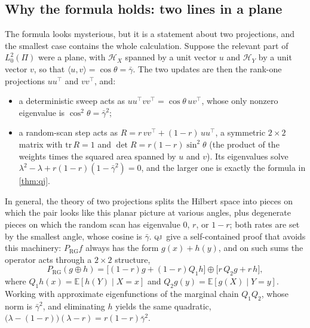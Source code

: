 \documentclass[11pt]{article}
\theoremstyle{remark}
\newcommand{\QJ}{\textsc{qj}}
\newcommand{\E}{\mathbb{E}}
\newcommand{\RG}{\mathrm{RG}}
\begin{document}
\subsection{Why the formula holds: two lines in a plane}
The formula looks mysterious, but it is a statement about two projections, and the smallest case contains the whole calculation. Suppose the relevant part of $L_0^2(\Pi)$ were a plane, with $\mathcal H_X$ spanned by a unit vector $u$ and $\mathcal H_Y$ by a unit vector $v$, so that $\langle u,v\rangle=\cos\theta=\bar\gamma$. The two updates are then the rank-one projections $uu^\top$ and $vv^\top$, and:
\begin{itemize}[leftmargin=1.3em,nosep]
\item a deterministic sweep acts as $uu^\top vv^\top=\cos\theta\,uv^\top$, whose only nonzero eigenvalue is $\cos^2\theta=\bar\gamma^2$;
\item a random-scan step acts as $R=r\,vv^\top+(1-r)\,uu^\top$, a symmetric $2\times2$ matrix with $\mathrm{tr}\,R=1$ and $\det R=r(1-r)\sin^2\theta$ (the product of the weights times the squared area spanned by $u$ and $v$). Its eigenvalues solve $\lambda^2-\lambda+r(1-r)(1-\bar\gamma^2)=0$, and the larger one is exactly the formula in \cref{thm:qj}.
\end{itemize}
In general, the theory of two projections \citep{bottcher2010gentle} splits the Hilbert space into pieces on which the pair looks like this planar picture at various angles, plus degenerate pieces on which the random scan has eigenvalue $0$, $r$, or $1-r$; both rates are set by the smallest angle, whose cosine is $\bar\gamma$. \QJ\ give a self-contained proof that avoids this machinery: $P_\RG f$ always has the form $g(x)+h(y)$, and on such sums the operator acts through a $2\times2$ structure,
\[
P_\RG(g\oplus h)=\bigl[(1-r)g+(1-r)Q_1h\bigr]\oplus\bigl[r\,Q_2g+r\,h\bigr],
\]
where $Q_1h(x)=\E[h(Y)\mid X=x]$ and $Q_2g(y)=\E[g(X)\mid Y=y]$.
Working with approximate eigenfunctions of the marginal chain $Q_1Q_2$, whose norm is $\bar\gamma^2$, and eliminating $h$ yields the same quadratic, $\bigl(\lambda-(1-r)\bigr)(\lambda-r)=r(1-r)\bar\gamma^2$.
\end{document}

